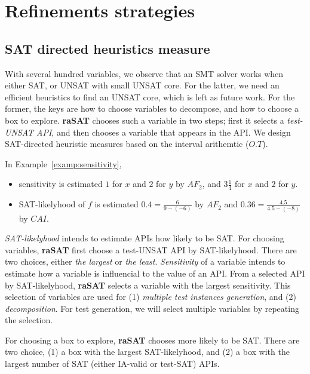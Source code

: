 \section{Refinements strategies}

\subsection{SAT directed heuristics measure} \label{sec:SATheuristics}

With several hundred variables, we observe that an SMT solver works 
when either SAT, or UNSAT with small UNSAT core.
%
For the latter, we need an efficient heuristics to find an UNSAT core, which is left as future work. 
For the former, the keys are how to choose variables to decompose, and 
how to choose a box to explore. 
{\bf raSAT} chooses such a variable in two steps; first it selects a {\em test-UNSAT API}, and
then chooses a variable that appears in the API. 
We design SAT-directed heuristic measures based on the interval arithemtic ($O.T$). 

\begin{example} \label{examp:SATlikelyhood}
In Example~\ref{examp:sensitivity}, 
\begin{itemize}
\item sensitivity is estimated $1$ for $x$ and $2$ for $y$ by $AF_2$, and $3\frac{1}{4}$ for $x$ and 
$2$ for $y$. 
\item SAT-likelyhood of $f$ is estimated $0.4= \frac{6}{9-(-6)}$ by $AF_2$ 
and $0.36 = \frac{4.5}{4.5-(-8)}$ by $CAI$. 
\end{itemize}
\end{example}


{\em SAT-likelyhood} intends to estimate APIs how likely to be SAT. 
For choosing variables, {\bf raSAT} first choose a test-UNSAT API by SAT-likelyhood. 
There are two choices, either {\em the largest} or {\em the least}. 
{\em Sensitivity} of a variable intends to estimate how a variable is influencial to the value of an API. 
From a selected API by SAT-likelyhood, {\bf raSAT} selects a variable with the largest sensitivity. 
This selection of variables are used for (1) {\em multiple test instances generation}, and 
(2) {\em decomposition}. 
For test generation, we will select multiple variables by repeating the selection. 

For choosing a box to explore, {\bf raSAT} chooses more likely to be SAT. 
There are two choice, (1) a box with the largest SAT-likelyhood, and 
(2) a box with the largest number of SAT (either IA-valid or test-SAT) APIs. 


